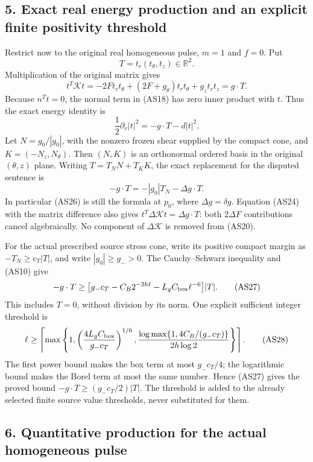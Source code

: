 \documentclass[10pt,a4paper]{article}
\begin{document}
\subsection{5. Exact real energy production and an explicit finite positivity threshold}\label{gclosure:exact-real-energy-production-and-an-explicit-finite-positivity-threshold}

Restrict now to the original real homogeneous pulse, \(m=1\) and \(f=0\). Put \[
T=t_r(t_\theta,t_z)\in\mathbb R^2.
\tag{AS23}
\] Multiplication of the original matrix gives \[
t^T\mathcal Kt=-2Ft_rt_\theta+(2F+g_\theta)t_rt_\theta+g_zt_rt_z=g\cdot T.
\tag{AS24}
\] Because \(n^Tt=0\), the normal term in (AS18) has zero inner product with \(t\). Thus the exact energy identity is \[
\frac12\partial_v|t|^2=-g\cdot T-d|t|^2.
\tag{AS25}
\] Let \(N=g_0/|g_0|\), with the nonzero frozen shear supplied by the compact cone, and \(K=(-N_z,N_\theta)\). Then \((N,K)\) is an orthonormal ordered basis in the original \((\theta,z)\) plane. Writing \(T=T_NN+T_KK\), the exact replacement for the disputed sentence is \[
-g\cdot T=-|g_0|T_N-\Delta g\cdot T.
\tag{AS26}
\] In particular (AS26) is still the formula at \(p_0\), where \(\Delta g=\delta g\). Equation (AS24) with the matrix difference also gives \(t^T\Delta\mathcal Kt=\Delta g\cdot T\): both \(2\Delta F\) contributions cancel algebraically. No component of \(\Delta\mathcal K\) is removed from (AS20).

For the actual prescribed source stress cone, write its positive compact margin as \(-T_N\ge c_T|T|\), and write \(|g_0|\ge g_->0\). The Cauchy--Schwarz inequality and (AS10) give \[
-g\cdot T\ge
\bigl[g_-c_T-C_B2^{-2h\ell}-L_gC_{\rm box}\ell^{-6}\bigr]|T|.
\tag{AS27}
\] This includes \(T=0\), without division by its norm. One explicit sufficient integer threshold is \[
\ell\ge\left\lceil\max\left\{
1,\left(\frac{4L_gC_{\rm box}}{g_-c_T}\right)^{1/6},
\frac{\log\max\{1,4C_B/(g_-c_T)\}}{2h\log2}
\right\}\right\rceil.
\tag{AS28}
\] The first power bound makes the box term at most \(g_-c_T/4\); the logarithmic bound makes the Borel term at most the same number. Hence (AS27) gives the proved bound \(-g\cdot T\ge(g_-c_T/2)|T|\). The threshold is added to the already selected finite source value thresholds, never substituted for them.

\subsection{6. Quantitative production for the actual homogeneous pulse}\label{gclosure:quantitative-production-for-the-actual-homogeneous-pulse}
\end{document}
